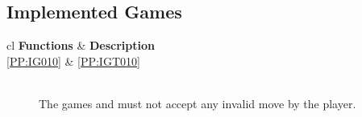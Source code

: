 
\subsection{Implemented Games}

\begin{tabular}{{c}{l}}
    \hline
    {\bf Functions} & {\bf Description} \\ \hline
	\ref{PP:IG010} & \ref{PP:IGT010} \\ \hline
\end{tabular}

\begin{description}
	\item[] \textbf{} \\
	The games \twixt and \graphcoloring must not accept any invalid move by the player.
\end{description}

